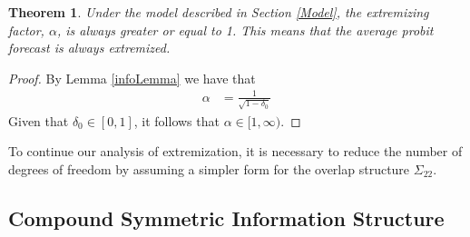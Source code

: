 \documentclass[11pt,twoside]{article}
\newtheorem{theorem}{Theorem}[section]
\begin{document}
\begin{theorem}
\label{positiveThm}
Under the model described in Section \ref{Model}, the extremizing factor, $\alpha$, is always greater or equal to 1. This means that the average probit forecast is always extremized. 
\end{theorem}
\begin{proof} 
By Lemma \ref{infoLemma} we have that 
\begin{align*}
\alpha &= \frac{1}{\sqrt{1-\delta_0}} 
\end{align*}
Given that $\delta_0 \in [0,1]$, it follows that $\alpha \in [1, \infty)$. 

\end{proof}

To continue our analysis of extremization, it is necessary to reduce the number of degrees of freedom by assuming a simpler form for the overlap structure $\Sigma_{22}$. 

\subsection{Compound Symmetric Information Structure}
\end{document}
